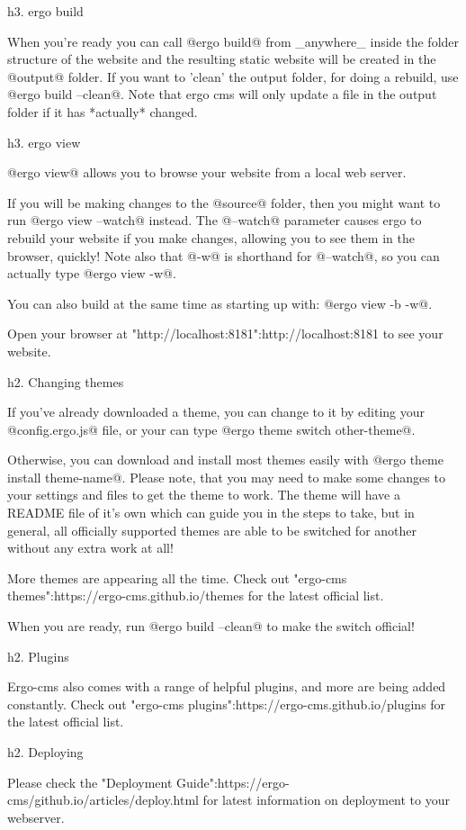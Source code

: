 h3. ergo build

When you're ready you can call @ergo build@ from _anywhere_ inside the folder structure of the website and the resulting static website will be created in the @output@ folder. If you want to 'clean' the output folder, for doing a rebuild, use @ergo build --clean@. Note that ergo cms will only update a file in the output folder if it has *actually* changed. 

h3. ergo view

@ergo view@ allows you to browse your website from a local web server.

If you will be making changes to the @source@ folder, then you might want to run @ergo view --watch@ instead. The @--watch@ parameter causes ergo to rebuild your website if you make changes, allowing you to see them in the browser, quickly! Note also that @-w@ is shorthand for @--watch@, so you can actually type @ergo view -w@. 

You can also build at the same time as starting up with: @ergo view -b -w@.

Open your browser at "http://localhost:8181":http://localhost:8181 to see your website.

h2. Changing themes

If you've already downloaded a theme, you can change to it by editing your @config.ergo.js@ file, or your can type @ergo theme switch other-theme@. 

Otherwise, you can download and install most themes easily with @ergo theme install theme-name@. Please note, that you may need to make some changes to your settings and files to get the theme to work. The theme will have a README file of it's own which can guide you in the steps to take, but in general, all officially supported themes are able to be switched for another without any extra work at all! 

More themes are appearing all the time. Check out "ergo-cms themes":https://ergo-cms.github.io/themes for the latest official list.

When you are ready, run @ergo build --clean@ to make the switch official!

h2. Plugins

Ergo-cms also comes with a range of helpful plugins, and more are being added constantly. Check out "ergo-cms plugins":https://ergo-cms.github.io/plugins for the latest official list.

h2. Deploying

Please check the "Deployment Guide":https://ergo-cms/github.io/articles/deploy.html for latest information on deployment to your webserver.

